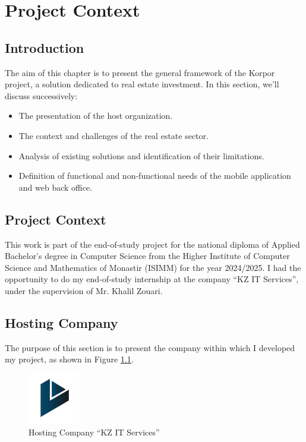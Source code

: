 \chapter{Project Context}

\section{Introduction}

The aim of this chapter is to present the general framework of the Korpor project, a solution dedicated to real estate investment. In this section, we'll discuss successively:

\begin{itemize}
    \item The presentation of the host organization.
    \item The context and challenges of the real estate sector.
    \item Analysis of existing solutions and identification of their limitations.
    \item Definition of functional and non-functional needs of the mobile application and web back office.
\end{itemize}

\section{Project Context}

This work is part of the end-of-study project for the national diploma of Applied Bachelor's degree in Computer Science from the Higher Institute of Computer Science and Mathematics of Monastir (ISIMM) for the year 2024/2025. I had the opportunity to do my end-of-study internship at the company
``KZ IT Services'', under the supervision of Mr. Khalil Zouari.

\section{Hosting Company}

The purpose of this section is to present the company within which I developed my project, as shown in Figure \ref{fig:hosting-company}.

\begin{figure}[htbp]
    \centering
    \includegraphics[width=0.2\textwidth]{images/company-logo.png}
    \caption{Hosting Company ``KZ IT Services''}
    \label{fig:hosting-company}
\end{figure}

